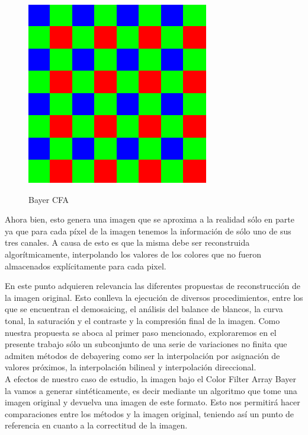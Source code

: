 \documentclass[a4paper]{article}
\begin{document}
\begin{figure}[h!]
	\caption{Bayer CFA}
	\begin{center}
	\includegraphics[scale=0.36]{imagenes/BayerFilter}
	\label{Bayer}
  \end{center}
\end{figure}


Ahora bien, esto genera una imagen que se aproxima a la realidad sólo en parte ya que para cada p\'ixel de la imagen tenemos la informaci\'on de s\'olo uno de sus tres canales. A causa de esto es que la misma debe ser reconstruida algorítmicamente, interpolando los valores de los colores que no fueron almacenados explícitamente para cada pixel.


En este punto adquieren relevancia las diferentes propuestas de reconstrucción de la imagen original. Esto conlleva la ejecución de diversos procedimientos, entre los que se encuentran el demosaicing, el análisis del balance de blancos, la curva tonal, la saturación y el contraste y la compresión final de la imagen. Como nuestra propuesta se aboca al primer paso mencionado, exploraremos en el presente trabajo sólo un subconjunto de una serie de variaciones no finita que admiten métodos de debayering como ser la interpolación por asignación de valores próximos, la interpolación bilineal y interpolación direccional.\\

A efectos de nuestro caso de estudio, la imagen bajo el Color Filter Array Bayer la vamos a generar sint\'eticamente, es decir mediante un algoritmo que tome una imagen original y devuelva una imagen de este formato. Esto nos permitir\'a hacer comparaciones entre los m\'etodos y la imagen original, teniendo as\'i un punto de referencia en cuanto a la correctitud de la imagen.
\end{document}

